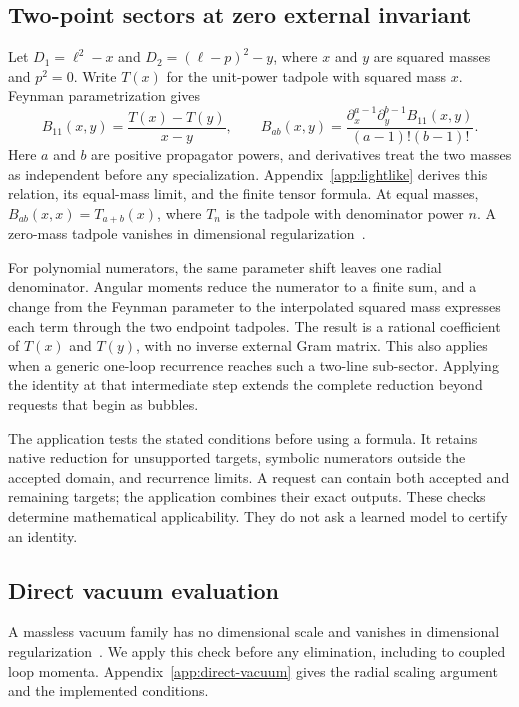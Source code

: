\documentclass[11pt,a4paper]{article}
\begin{document}
\subsection{Two-point sectors at zero external invariant}
Let $D_1=\ell^2-x$ and $D_2=(\ell-p)^2-y$, where $x$ and $y$ are squared masses and $p^2=0$. Write $T(x)$ for the unit-power tadpole with squared mass $x$. Feynman parametrization gives
\begin{equation}
 B_{11}(x,y)=\frac{T(x)-T(y)}{x-y},\qquad
 B_{ab}(x,y)=\frac{\partial_x^{a-1}\partial_y^{b-1}B_{11}(x,y)}{(a-1)!(b-1)!}.
 \label{eq:light-main}
\end{equation}
Here $a$ and $b$ are positive propagator powers, and derivatives treat the two masses as independent before any specialization. Appendix~\ref{app:lightlike} derives this relation, its equal-mass limit, and the finite tensor formula. At equal masses, $B_{ab}(x,x)=T_{a+b}(x)$, where $T_n$ is the tadpole with denominator power $n$. A zero-mass tadpole vanishes in dimensional regularization~\cite{Weinzierl2022}.

For polynomial numerators, the same parameter shift leaves one radial denominator. Angular moments reduce the numerator to a finite sum, and a change from the Feynman parameter to the interpolated squared mass expresses each term through the two endpoint tadpoles. The result is a rational coefficient of $T(x)$ and $T(y)$, with no inverse external Gram matrix. This also applies when a generic one-loop recurrence reaches such a two-line sub-sector. Applying the identity at that intermediate step extends the complete reduction beyond requests that begin as bubbles.

The application tests the stated conditions before using a formula. It retains native reduction for unsupported targets, symbolic numerators outside the accepted domain, and recurrence limits. A request can contain both accepted and remaining targets; the application combines their exact outputs. These checks determine mathematical applicability. They do not ask a learned model to certify an identity.

\subsection{Direct vacuum evaluation}
A massless vacuum family has no dimensional scale and vanishes in dimensional regularization~\cite{Weinzierl2022}. We apply this check before any elimination, including to coupled loop momenta. Appendix~\ref{app:direct-vacuum} gives the radial scaling argument and the implemented conditions.
\end{document}
